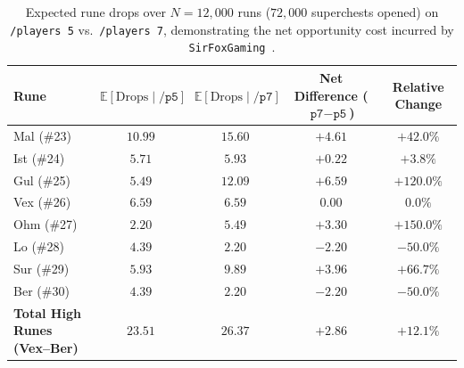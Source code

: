 \documentclass[11pt,reqno]{amsart}
\theoremstyle{definition}
\begin{document}
\begin{table}[htbp]
\centering
\caption{Expected rune drops over $N = 12{,}000$ runs ($72{,}000$ superchests opened) on \texttt{/players~5} vs.\ \texttt{/players~7}, demonstrating the net opportunity cost incurred by \texttt{SirFoxGaming}~\cite{sirfox2023}.}
\label{tab:sirfox}
\footnotesize
\setlength{\tabcolsep}{5pt}
\begin{tabular}{@{}lcccc@{}}
\toprule
Rune & $\mathbb{E}[\text{Drops} \mid \texttt{/p5}]$ & $\mathbb{E}[\text{Drops} \mid \texttt{/p7}]$ & Net Difference ($\texttt{p7} - \texttt{p5}$) & Relative Change \\
\midrule
Mal (\#23) & $10.99$ & $15.60$ & $\mathbf{+4.61}$ & $+42.0\%$ \\
Ist (\#24) & $5.71$  & $5.93$  & $+0.22$ & $+3.8\%$ \\
Gul (\#25) & $5.49$  & $12.09$ & $\mathbf{+6.59}$ & $+120.0\%$ \\
Vex (\#26) & $6.59$  & $6.59$  & $0.00$ & $0.0\%$ \\
Ohm (\#27) & $2.20$  & $5.49$  & $\mathbf{+3.30}$ & $+150.0\%$ \\
Lo (\#28)  & $4.39$  & $2.20$  & $-2.20$ & $-50.0\%$ \\
Sur (\#29) & $5.93$  & $9.89$  & $\mathbf{+3.96}$ & $+66.7\%$ \\
Ber (\#30) & $4.39$  & $2.20$  & $-2.20$ & $-50.0\%$ \\
\midrule
\textbf{Total High Runes (Vex--Ber)} & $\mathbf{23.51}$ & $\mathbf{26.37}$ & $\mathbf{+2.86}$ & $\mathbf{+12.1\%}$ \\
\bottomrule
\end{tabular}
\end{table}
\end{document}
